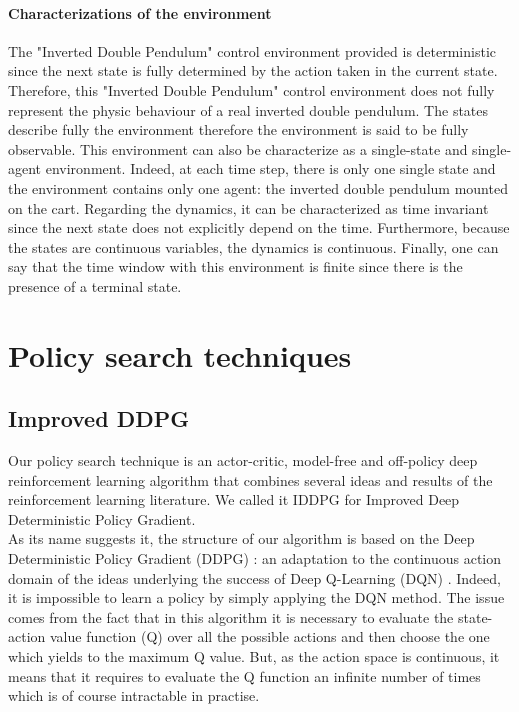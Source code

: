 \paragraph{Characterizations of
the environment}

The "Inverted Double Pendulum" control environment provided is deterministic since the next state is fully determined by the action taken in the current state. Therefore, this "Inverted Double Pendulum" control environment does not fully represent the physic behaviour of a real inverted double pendulum. The states describe fully the environment therefore the environment is said to be fully observable. This environment can also be characterize as a single-state and single-agent environment. Indeed, at each time step, there is only one single state and the environment contains only one agent: the inverted double pendulum mounted on the cart.  Regarding the dynamics, it can be characterized as time invariant since the next state does not explicitly depend on the time. Furthermore, because the states are continuous variables, the dynamics is continuous. Finally, one can say that the time window with this environment is finite since there is the presence of a terminal state. 

\section{Policy search techniques}

\subsection{Improved DDPG}

Our policy search technique is an actor-critic, model-free and off-policy deep reinforcement learning algorithm that combines several ideas and results of the reinforcement learning literature. We called it IDDPG for Improved Deep Deterministic Policy Gradient. \\

As its name suggests it, the structure of our algorithm is based on the Deep Deterministic Policy Gradient (DDPG) \cite{ddpg}: an adaptation to the continuous action domain of the ideas underlying the success of Deep Q-Learning (DQN) \cite{atari} . Indeed, it is impossible to learn a policy by simply applying the DQN method. The issue comes from the fact that in this algorithm it is necessary to evaluate the state-action value function (Q) over all the possible actions and then choose the one which yields to the maximum Q value. But, as the action space is continuous, it means that it requires to evaluate the Q function an infinite number of times which is of course intractable in practise. \\

